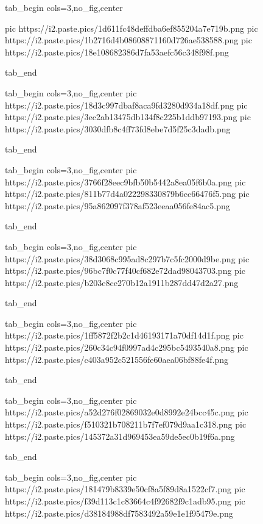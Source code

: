  
 
 
 
 
\zzSecCmtScr

\ifcmt
  tab_begin cols=3,no_fig,center

     pic https://i2.paste.pics/1d611fc48deffdba6ef855204a7e719b.png
		 pic https://i2.paste.pics/1b2716d4b08608871160d726ae538588.png
		 pic https://i2.paste.pics/18e108682386d7fa53aefc56c348f98f.png

  tab_end
\fi

\ifcmt
  tab_begin cols=3,no_fig,center
	pic https://i2.paste.pics/18d3c997dbaf8aca9fd3280d934a18df.png
	pic https://i2.paste.pics/3ec2ab13475db134f8c225b1ddb97193.png
	pic https://i2.paste.pics/3030dfb8c4ff73fd8ebe7d5f25c3dadb.png

  tab_end
\fi

\ifcmt
  tab_begin cols=3,no_fig,center
	pic https://i2.paste.pics/3766f28eec9bfb50b5442a8ea05f6b0a.png
	pic https://i2.paste.pics/811b77d4a022298330879b6cc66476f5.png
	pic https://i2.paste.pics/95a862097f378af523eeaa056fe84ac5.png

  tab_end
\fi

\ifcmt
  tab_begin cols=3,no_fig,center
	pic https://i2.paste.pics/38d3068c995ad8c297b7c5fc2000d9be.png
	pic https://i2.paste.pics/96bc7f0c77f40cf682e72dad98043703.png
	pic https://i2.paste.pics/b203e8ce270b12a1911b287dd47d2a27.png

  tab_end
\fi

\ifcmt
  tab_begin cols=3,no_fig,center
	pic https://i2.paste.pics/1ff5872f2b2c1d46193171a70df14d1f.png
	pic https://i2.paste.pics/260c34c94f0997ad4c295bc5493540a8.png
	pic https://i2.paste.pics/c403a952c521556fe60aea06bf88fe4f.png

  tab_end
\fi

\ifcmt
  tab_begin cols=3,no_fig,center
	pic https://i2.paste.pics/a52d276f02869032e0d8992e24bcc45c.png
	pic https://i2.paste.pics/f510321b708211b7f7ef079d9aa1c318.png
	pic https://i2.paste.pics/145372a31d969453ea59de5ec0b19f6a.png

  tab_end
\fi

\ifcmt
  tab_begin cols=3,no_fig,center
	pic https://i2.paste.pics/181479b8339e50cf8a5f89d8a1522cf7.png
	pic https://i2.paste.pics/f39d113c1c83664c4f92682f9c1adb95.png
	pic https://i2.paste.pics/d38184988df7583492a59e1e1f95479e.png

